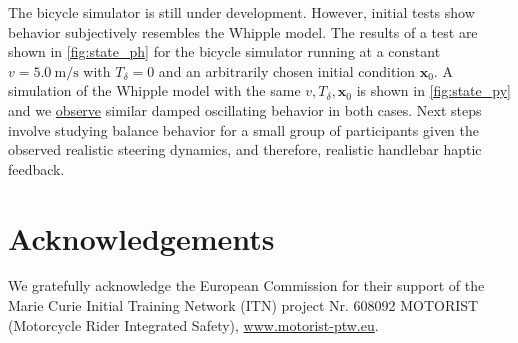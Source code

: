\documentclass{icsc2017a}
\newcommand{\state}{\bm{x}}
\newcommand{\steer}{\delta}
\begin{document}
The bicycle simulator is still under development.
However, initial tests show behavior subjectively resembles the Whipple model.
The results of a test are shown in \autoref{fig:state_ph} for the bicycle simulator running at a constant
$v = \SI[per-mode=symbol]{5.0}{\meter\per\second}$ with $T_{\steer} = 0$ and an arbitrarily chosen initial condition
$\state_0$.
A simulation of the Whipple model with the same $v, T_\steer, \state_0$ is shown in \autoref{fig:state_py} and we
\href{https://youtu.be/ekhSaXHQY9w}{observe} similar damped oscillating behavior in both cases.
Next steps involve studying balance behavior for a small group of participants given the observed realistic steering
dynamics, and therefore, realistic handlebar haptic feedback.

\section{Acknowledgements}

We gratefully acknowledge the European Commission for their support of the Marie Curie Initial Training Network (ITN)
project Nr. 608092 MOTORIST (Motorcycle Rider Integrated Safety),
\mbox{\href{http://www.motorist-ptw.eu}{www.motorist-ptw.eu}}.

\footnotesize

\end{document}
